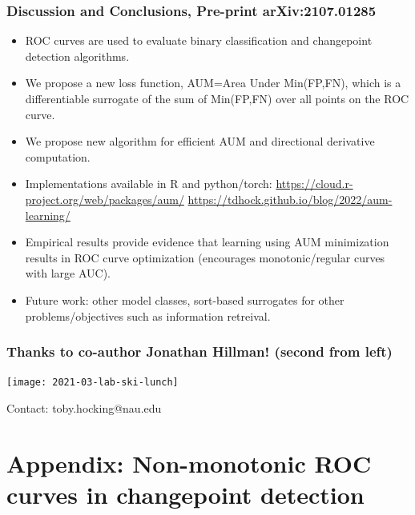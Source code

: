 \documentclass[t]{beamer}
\begin{document}
\begin{frame}
  \frametitle{Discussion and Conclusions, Pre-print arXiv:2107.01285}
  \begin{itemize}
  \item ROC curves are used to evaluate binary classification and
    changepoint detection algorithms.
  \item We propose a new loss function, AUM=Area Under Min(FP,FN),
    which is a differentiable surrogate of the sum of Min(FP,FN) over
    all points on the ROC curve.
  \item We propose new algorithm for efficient AUM and directional
    derivative computation.
  \item Implementations available in R and python/torch:
    \url{https://cloud.r-project.org/web/packages/aum/}
    \url{https://tdhock.github.io/blog/2022/aum-learning/}
  \item Empirical results provide evidence that learning using AUM
    minimization results in ROC curve optimization (encourages
    monotonic/regular curves with large AUC).
  \item Future work: other model classes, sort-based surrogates for
    other problems/objectives such as information retreival.
  \end{itemize}
\end{frame}

\begin{frame}
  \frametitle{Thanks to co-author Jonathan Hillman! (second from left)}

  \texttt{[image: 2021-03-lab-ski-lunch]} 

  Contact: toby.hocking@nau.edu

\end{frame}

\section{Appendix: Non-monotonic ROC curves in changepoint detection}
\end{document}
